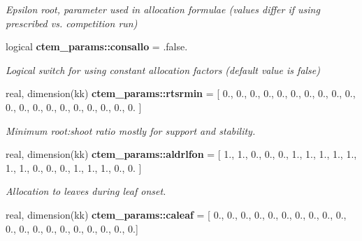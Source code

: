 \begin{DoxyCompactItemize}
\begin{DoxyCompactList}\small\item\em Epsilon root, parameter used in allocation formulae (values differ if using prescribed vs. competition run) \end{DoxyCompactList}\item 
\hypertarget{namespacectem__params_a7fc44574a63fd52e0b2556ba693de814}{}logical {\bfseries ctem\+\_\+params\+::consallo} = .false.\label{namespacectem__params_a7fc44574a63fd52e0b2556ba693de814}

\begin{DoxyCompactList}\small\item\em Logical switch for using constant allocation factors (default value is false) \end{DoxyCompactList}\item 
\hypertarget{namespacectem__params_ac542a7713cfae8ce6e7197c8d60c2081}{}real, dimension(kk) {\bfseries ctem\+\_\+params\+::rtsrmin} = \mbox{[} 0., 0., 0., 0., 0., 0., 0., 0., 0., 0., 0., 0., 0., 0., 0., 0., 0., 0., 0., 0. \mbox{]}\label{namespacectem__params_ac542a7713cfae8ce6e7197c8d60c2081}

\begin{DoxyCompactList}\small\item\em Minimum root\+:shoot ratio mostly for support and stability. \end{DoxyCompactList}\item 
\hypertarget{namespacectem__params_ab8a436206695f5f6c93d0579187ba037}{}real, dimension(kk) {\bfseries ctem\+\_\+params\+::aldrlfon} = \mbox{[} 1., 1., 0., 0., 0., 1., 1., 1., 1., 1., 1., 1., 0., 0., 0., 1., 1., 1., 0., 0. \mbox{]}\label{namespacectem__params_ab8a436206695f5f6c93d0579187ba037}

\begin{DoxyCompactList}\small\item\em Allocation to leaves during leaf onset. \end{DoxyCompactList}\item 
\hypertarget{namespacectem__params_a593225b4810a8b566176f0ada4a2ad7a}{}real, dimension(kk) {\bfseries ctem\+\_\+params\+::caleaf} = \mbox{[} 0., 0., 0., 0., 0., 0., 0., 0., 0., 0., 0., 0., 0., 0., 0., 0., 0., 0., 0., 0.\mbox{]}\label{namespacectem__params_a593225b4810a8b566176f0ada4a2ad7a}


\end{DoxyCompactItemize}
